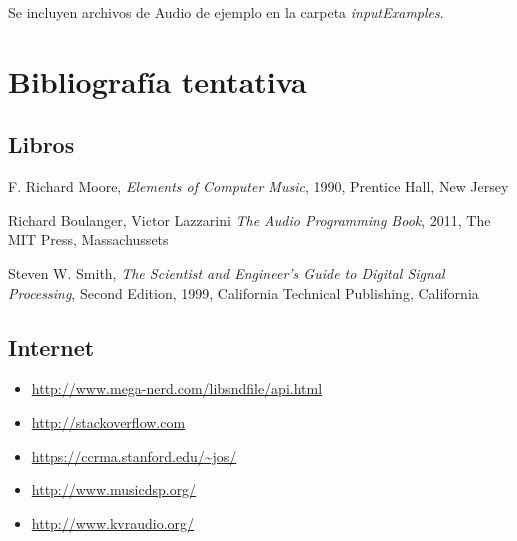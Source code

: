 \documentclass[a4paper,spanish,12pt]{article}
\begin{document}
Se incluyen archivos de Audio de ejemplo en la carpeta \textit{inputExamples}.

\newpage

\section{Bibliografía tentativa}
\subsection{Libros}
\begin{thebibliography}{9}
  F. Richard Moore,
  \emph{Elements of Computer Music},
  1990, Prentice Hall, New Jersey

  Richard Boulanger, Victor Lazzarini
  \emph{The Audio Programming Book},
  2011, The MIT Press, Massachussets

  Steven W. Smith,
  \emph{The Scientist and Engineer's Guide to Digital Signal Processing},
  Second Edition, 1999, California Technical Publishing, California
\end{thebibliography}
  
\subsection{Internet}

\begin{itemize}
\item \url{http://www.mega-nerd.com/libsndfile/api.html}
\item \url{http://stackoverflow.com}
\item \url{https://ccrma.stanford.edu/~jos/}
\item \url{http://www.musicdsp.org/}
\item \url{http://www.kvraudio.org/}
\end{itemize}
\end{document}
